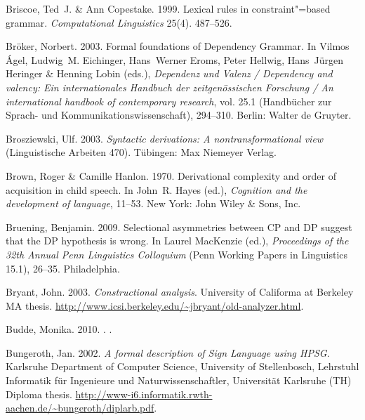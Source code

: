 \begin{thebibliography}{1420}
Briscoe, Ted~J. \& Ann Copestake. 1999.
\newblock Lexical rules in constraint"=based grammar.
\newblock \emph{Computational Linguistics} 25(4). 487--526.

Br{\"o}ker, Norbert. 2003.
\newblock Formal foundations of {Dependency Grammar}.
\newblock In Vilmos {\'A}gel, Ludwig~M. Eichinger, Hans~Werner Eroms, Peter
  Hellwig, Hans~J{\"u}rgen Heringer \& Henning Lobin (eds.), \emph{{Dependenz
  und Valenz} / {Dependency} and valency: {Ein internationales Handbuch der
  zeitgen{\"o}ssischen Forschung} / {An} international handbook of contemporary
  research}, vol. 25.1  (Hand\-b{\"u}\-cher zur Sprach- und
  Kommunikationswissenschaft), 294--310. Berlin: Walter de Gruyter.

Brosziewski, Ulf. 2003.
\newblock \emph{Syntactic derivations: {A} nontransformational view}
  (Linguistische Arbeiten 470).
\newblock T\"u\-bing\-en: Max Niemeyer Verlag.

Brown, Roger \& Camille Hanlon. 1970.
\newblock Derivational complexity and order of acquisition in child speech.
\newblock In John~R. Hayes (ed.), \emph{Cognition and the development of
  language}, 11--53. New York: John Wiley \& Sons, Inc.

Bruening, Benjamin. 2009.
\newblock Selectional asymmetries between {CP} and {DP} suggest that the {DP}
  hypothesis is wrong.
\newblock In Laurel MacKenzie (ed.), \emph{Proceedings of the {32th Annual Penn
  Linguistics Colloquium}} (Penn Working Papers in Linguistics 15.1), 26--35.
  Philadelphia.

Bryant, John. 2003.
\newblock \emph{Constructional analysis}.
\newblock University of Califorma at Berkeley MA thesis.
\newblock
  \urlprefix\url{http://www.icsi.berkeley.edu/~jbryant/old-analyzer.html}.

Budde, Monika. 2010.
.
.

Bungeroth, Jan. 2002.
\newblock \emph{A formal description of {Sign Language} using {HPSG}}.
\newblock Karlsruhe Department of Computer Science, University of Stellenbosch,
  Lehrstuhl Informatik f{\"u}r Ingenieure und Naturwissenschaftler,
  Universit{\"a}t Karlsruhe (TH) Diploma thesis.
\newblock
  \urlprefix\url{http://www-i6.informatik.rwth-aachen.de/~bungeroth/diplarb.pdf}.


\end{thebibliography}
